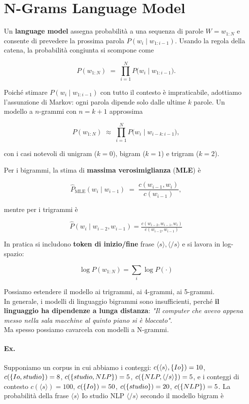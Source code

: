 
\blank
\newpage

\section{N-Grams Language Model}

    Un \textbf{language model} assegna probabilità a una sequenza di parole $W=w_{1:N}$ e consente di prevedere la prossima parola $P(w_i\mid w_{1:i-1})$. Usando la regola della catena, la probabilità congiunta si scompone come
    
    $$
    P(w_{1:N}) \;=\; \prod_{i=1}^{N} P\big(w_i \mid w_{1:i-1}\big).
    $$
    
    Poiché stimare $P(w_i\mid w_{1:i-1})$ con tutto il contesto è impraticabile, adottiamo l'assunzione di Markov: ogni parola dipende solo dalle ultime $k$ parole. Un modello a $n$-grammi con $n=k+1$ approssima
    
    $$
    P(w_{1:N}) \;\approx\; \prod_{i=1}^{N} P\big(w_i \mid w_{i-k:i-1}\big),
    $$
    
    con i casi notevoli di unigram ($k=0$), bigram ($k=1$) e trigram ($k=2$).
    
    Per i bigrammi, la stima di \textbf{massima verosimiglianza} (\textbf{MLE}) è
    
    $$
    \hat P_{\text{MLE}}(w_i\mid w_{i-1}) \;=\; \frac{c(w_{i-1},w_i)}{c(w_{i-1})},
    $$
    
    mentre per i trigrammi è 
    
    $$\hat P(w_i\mid w_{i-2},w_{i-1}) = \tfrac{c(w_{i-2},w_{i-1},w_i)}{c(w_{i-2},w_{i-1})}$$
    
    In pratica si includono \textbf{token di inizio/fine} frase $\langle s\rangle,\langle/ s\rangle$ e si lavora in log-spazio: 
    
    $$\log P(w_{1:N}) = \sum_i \log P(\cdot)$$

    Possiamo estendere il modello ai trigrammi, ai 4-grammi, ai 5-grammi.\\
    In generale, i modelli di linguaggio bigrammi sono insufficienti, perché \textbf{il linguaggio ha dipendenze a lunga distanza}:
    \textit{"Il computer che avevo appena messo nella sala macchine
    al quinto piano si è bloccato"}.\\
    Ma spesso possiamo cavarcela con modelli a N-grammi. 
    
    \paragraph{Ex.\\}
    Supponiamo un corpus in cui abbiamo i conteggi: $c(\langle s\rangle,\text\{Io\})=10$, $c(\text\{Io, studio\})=8$, $c(\text\{studio, NLP\})=5$, $c(\text\{NLP, \langle/ s\rangle\})=5$, e i conteggi di contesto $c(\langle s\rangle)=100$, $c(\text\{Io\})=50$, $c(\text\{studio\})=20$, $c(\text\{NLP\})=5$. La probabilità della frase $\langle s\rangle$ Io studio NLP $\langle/ s\rangle$ secondo il modello bigram è
    
